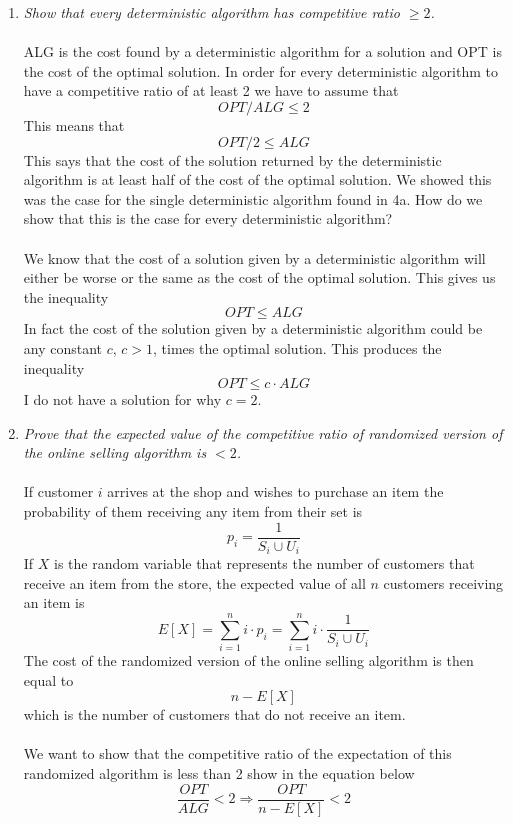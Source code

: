 \documentclass[12pt]{article}
\begin{document}
\begin{enumerate}
\begin{enumerate}
      \item \textit{Show that every deterministic algorithm has competitive
      ratio $\ge 2$.}\\
      \\
      ALG is the cost found by a deterministic algorithm for a solution and
      OPT is the cost of the optimal solution.  In order for every deterministic
      algorithm to have a competitive ratio of at least 2 we have to assume that
      $$
      OPT/ALG \le 2
      $$
      This means that
      $$
      OPT/2 \le ALG
      $$
      This says that the cost of the solution returned by the deterministic
      algorithm is at least half of the cost of the optimal solution.  We showed
      this was the case for the single deterministic algorithm found in 4a.  How
      do we show that this is the case for every deterministic algorithm?\\
      \\
      We know that the cost of a solution given by a deterministic algorithm
      will either be worse or the same as the cost of the optimal solution. 
      This gives us the inequality
      $$
      OPT \le ALG
      $$
      In fact the cost of the solution given by a deterministic algorithm could
      be any constant $c$, $c > 1$, times the optimal
      solution.
      This produces the inequality
      $$
      OPT \le c \cdot ALG
      $$
      I do not have a solution for why $c=2$.
      \item \textit{Prove that the expected value of the competitive ratio of
      randomized version of the online selling algorithm is $< 2$.}\\
      \\
      If customer $i$ arrives at the shop and wishes to purchase an item the
      probability of them receiving any item from their set is 
      $$
      p_i = \frac{1}{S_i \cup U_i}
      $$
      If $X$ is the random variable that represents the number of customers
      that receive an item from the store, the expected value of all $n$
      customers receiving an item is 
      $$ 
      E[X] = \sum_{i=1}^{n} i \cdot p_i = \sum_{i=1}^{n} i \cdot \frac{1}{S_i
      \cup U_i} $$
      The cost of the randomized version of the online selling algorithm is then
      equal to
      $$
      n - E[X]
      $$
      which is the number of customers that do not receive an item.\\
      \\
      We want to show that the competitive ratio of the expectation of this
      randomized algorithm is less than 2 show in the equation below 
      $$
      \frac{OPT}{ALG} < 2 \Rightarrow \frac{OPT}{n-E[X]} < 2
      $$
      

\end{enumerate}
\end{enumerate}
\end{document}
